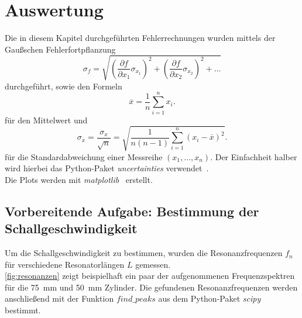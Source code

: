 \section{Auswertung}
\label{sec:Auswertung}

Die in diesem Kapitel durchgeführten Fehlerrechnungen wurden mittels der Gaußschen Fehlerfortpflanzung 
\begin{equation}
    \sigma_f = \sqrt{\left( \frac{\partial f}{\partial x_1} \sigma_{x_1} \right)^2 + \left( \frac{\partial f}{\partial x_2} \sigma_{x_2} \right)^2 + \ldots}
\end{equation}
durchgeführt, sowie den Formeln 
\begin{equation}
    \overline{x} = \frac{1}{n} \sum^n_{i=1}x_i . 
    \label{eq:mittelwert}
\end{equation}
für den Mittelwert und 
\begin{equation}
    \sigma_{\overline{x}} = \frac{\sigma_x}{\sqrt{n}} = \sqrt{\frac{1}{n(n-1)}  \sum^n_{i=1} \left( x_i - \overline{x}\right)^2 } .
    \label{eq:abweichung}
\end{equation}
für die Standardabweichung einer Messreihe $\left( x_1, \ldots , x_n  \right)$.
Der Einfachheit halber wird hierbei das Python-Paket \textit{uncertainties} verwendet~\cite{uncertainties}. \\
Die Plots werden mit \textit{matplotlib}~\cite{matplotlib} erstellt. \\
\hspace{1cm}

\subsection{Vorbereitende Aufgabe: Bestimmung der Schallgeschwindigkeit}

Um die Schallgeschwindigkeit zu bestimmen, wurden die Resonanzfrequenzen $f_n$ für verschiedene Resonatorlängen $L$ gemessen. \\
\autoref{fig:resonanzen} zeigt beispielhaft ein paar der aufgenommenen Frequenzspektren für die \qty{75}{mm} und \qty{50}{mm} Zylinder.
Die gefundenen Resonanzfrequenzen werden anschließend mit der Funktion $\textit{find\_peaks}$ aus dem Python-Paket \textit{scipy} bestimmt.~\cite{scipy} \\


